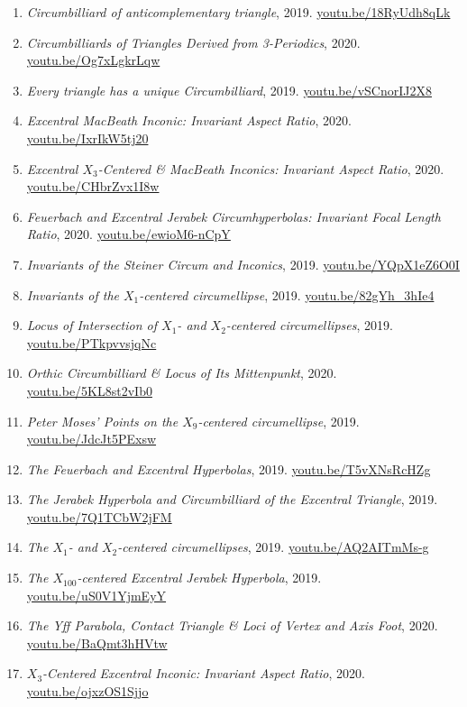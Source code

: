 \documentclass[12pt]{article}
\begin{document}
\begin{enumerate}[resume]
\item \textit{Circumbilliard of anticomplementary triangle}, 2019. \href{https://youtu.be/18RyUdh8qLk}{\url{youtu.be/18RyUdh8qLk}}
\item \textit{Circumbilliards of Triangles Derived from 3-Periodics}, 2020. \href{https://youtu.be/Og7xLgkrLqw}{\url{youtu.be/Og7xLgkrLqw}}
\item \textit{Every triangle has a unique Circumbilliard}, 2019. \href{https://youtu.be/vSCnorIJ2X8}{\url{youtu.be/vSCnorIJ2X8}}
\item \textit{Excentral MacBeath Inconic: Invariant Aspect Ratio}, 2020. \href{https://youtu.be/IxrIkW5tj20}{\url{youtu.be/IxrIkW5tj20}}
\item \textit{Excentral $X_{3}$-Centered \& MacBeath Inconics: Invariant Aspect Ratio}, 2020. \href{https://youtu.be/CHbrZvx1I8w}{\url{youtu.be/CHbrZvx1I8w}}
\item \textit{Feuerbach and Excentral Jerabek Circumhyperbolas: Invariant Focal Length Ratio}, 2020. \href{https://youtu.be/ewioM6-nCpY}{\url{youtu.be/ewioM6-nCpY}}
\item \textit{Invariants of the Steiner Circum and Inconics}, 2019. \href{https://youtu.be/YQpX1eZ6O0I}{\url{youtu.be/YQpX1eZ6O0I}}
\item \textit{Invariants of the $X_{1}$-centered circumellipse}, 2019. \href{https://youtu.be/82gYh_3hIe4}{\url{youtu.be/82gYh\_3hIe4}}
\item \textit{Locus of Intersection of $X_{1}$- and $X_{2}$-centered circumellipses}, 2019. \href{https://youtu.be/PTkpvvsjqNc}{\url{youtu.be/PTkpvvsjqNc}}
\item \textit{Orthic Circumbilliard \& Locus of Its Mittenpunkt}, 2020. \href{https://youtu.be/5KL8st2vIb0}{\url{youtu.be/5KL8st2vIb0}}
\item \textit{Peter Moses' Points on the $X_{9}$-centered circumellipse}, 2019. \href{https://youtu.be/JdcJt5PExsw}{\url{youtu.be/JdcJt5PExsw}}
\item \textit{The Feuerbach and Excentral Hyperbolas}, 2019. \href{https://youtu.be/T5vXNsRcHZg}{\url{youtu.be/T5vXNsRcHZg}}
\item \textit{The Jerabek Hyperbola and Circumbilliard of the Excentral Triangle}, 2019. \href{https://youtu.be/7Q1TCbW2jFM}{\url{youtu.be/7Q1TCbW2jFM}}
\item \textit{The $X_{1}$- and $X_{2}$-centered circumellipses}, 2019. \href{https://youtu.be/AQ2AITmMs-g}{\url{youtu.be/AQ2AITmMs-g}}
\item \textit{The $X_{100}$-centered Excentral Jerabek Hyperbola}, 2019. \href{https://youtu.be/uS0V1YjmEyY}{\url{youtu.be/uS0V1YjmEyY}}
\item \textit{The Yff Parabola, Contact Triangle \& Loci of Vertex and Axis Foot}, 2020. \href{https://youtu.be/BaQmt3hHVtw}{\url{youtu.be/BaQmt3hHVtw}}
\item \textit{$X_{3}$-Centered Excentral Inconic: Invariant Aspect Ratio}, 2020. \href{https://youtu.be/ojxzOS1Sjjo}{\url{youtu.be/ojxzOS1Sjjo}}
\end{enumerate}
\end{document}
